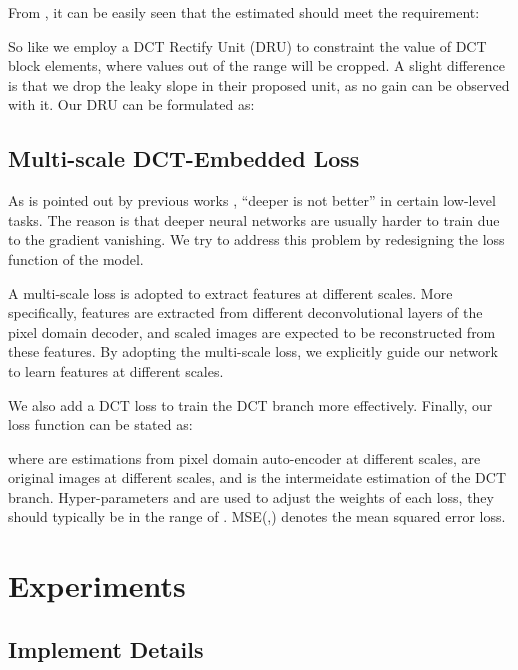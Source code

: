 \documentclass{article}
\begin{document}
From , it can be easily seen that the estimated 
should meet the requirement:

So like \cite{guo2016building} we employ a DCT Rectify Unit (DRU) to constraint
the value of DCT block elements, where values out of the range will be cropped.
A slight difference is that we drop the leaky slope  in their proposed
unit, as no gain can be observed with it. Our DRU can be formulated as:

\footnotesize

\normalsize

\vspace{-0.3cm}
\subsection{Multi-scale DCT-Embedded Loss}
\label{ssec:mmse}

As is pointed out by previous works \cite{dong2014learning}
 \cite{dong2015compression}, ``deeper is not better'' in certain
low-level tasks. The reason is that deeper neural networks are usually harder
to train due to the gradient vanishing. We try to address this problem by
redesigning the loss function of the model.

A multi-scale loss is adopted to extract features at different scales.
More specifically, features are extracted from different
deconvolutional layers of the pixel domain decoder, and
scaled images are expected to be reconstructed from these features.
By adopting the multi-scale loss, we explicitly guide our network to learn
features at different scales. 

We also add a DCT loss to train the DCT branch more effectively. Finally,
our loss function can be stated as:

where  are estimations from pixel domain auto-encoder
at different scales,  are original images at different scales,
and  is the intermeidate estimation of the DCT branch.
Hyper-parameters  and  are used to adjust the weights of
each loss, they should typically be in the range of .
MSE(,) denotes the mean squared error loss.
\vspace{-0.2cm}

\section{Experiments}
\vspace{-0.1cm}
\label{sec:exp}
\subsection{Implement Details}
\label{ssec:detail}
\end{document}
